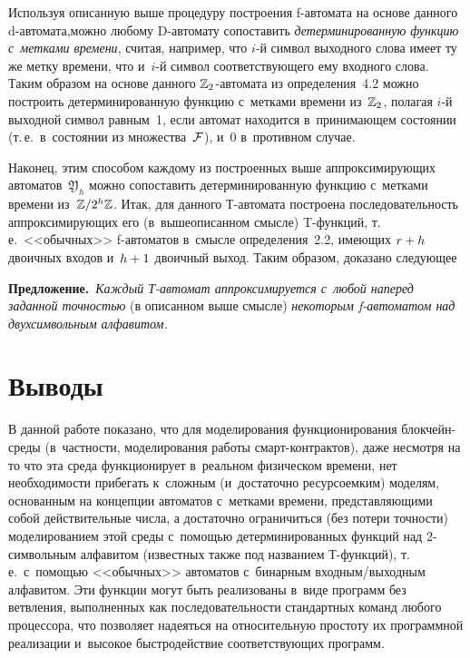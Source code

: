 \begin{multicols}{2}
Используя описанную выше процедуру по\-стро\-ения f-ав\-то\-ма\-та на основе
данного d-ав\-то\-ма\-та,\linebreak можно   любому D-ав\-то\-ма\-ту  
сопоставить  \textit{детерминированную
функцию с~метками времени},  считая, например, что $i$-й символ выходного слова
имеет ту же метку времени, что и~$i$-й символ соответствующего ему входного слова. 
Таким  образом  на основе данного $\mathbb{Z}_2$-ав\-то\-ма\-та из определения~4.2
можно построить детерминированную функцию с~метками времени  из~$\mathbb{Z}_2$,
полагая $i$-й выходной символ равным~1, если автомат находится в~принимающем
состоянии (т.\,е.\ в~состоянии из множества~$\mathcal F$), и~0 в~противном случае.

Наконец, этим способом каждому из построенных  выше аппроксимирующих автоматов~$\mathfrak Y_h$ 
можно сопоставить детерминированную функцию с~метками времени
из~$\mathbb{Z}/2^h\mathbb{Z}$. Итак, для данного Т-ав\-то\-ма\-та построена последовательность
аппроксимирующих его (в~вышеописанном смысле)  T-функ\-ций, т.\,е.\ <<обычных>> f-ав\-то\-ма\-тов 
в~смысле определения~2.2, имеющих $r\hm+h$ двоичных входов и~$h\hm+1$ 
двоичный выход. Таким образом, доказано следующее

\smallskip

\noindent
\textbf{Предложение.}\
\textit{Каждый Т-ав\-то\-мат аппроксимируется с~любой наперед заданной 
точностью} (в описанном выше смысле) 
\textit{некоторым f-ав\-то\-ма\-том над двухсимвольным алфавитом.}

\vspace*{-9pt}


\section{Выводы}

\vspace*{-2pt}

В данной работе показано, что для моделирования функционирования блок\-чейн-сре\-ды 
(в~част\-ности, моделирования работы
смарт-кон\-трак\-тов), даже несмотря на то что эта среда функционирует в~реальном
физическом времени, нет не\-об\-хо\-ди\-мости прибегать к~сложным (и~достаточно ресурсоемким)
моделям, основанным на концепции автоматов с~метками времени, представляющими 
собой действительные числа, а достаточно
ограничиться (без потери точности) моделированием этой среды с~помощью 
 детерминированных
функций над \mbox{2-сим}\-воль\-ным алфавитом (известных также под названием Т-функ\-ций),
т.\,е.\ с~по\-мощью <<обычных>> автоматов с~бинарным вход\-ным/вы\-ход\-ным алфавитом. 
Эти функции могут быть реализованы в~виде программ
без ветвления, выполненных как последовательности стандартных команд любого
процессора, что позволяет надеяться на относительную простоту их программной
реализации и~высокое быстродействие соответствующих программ.


\end{multicols}
